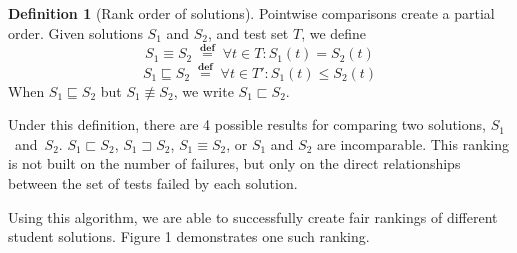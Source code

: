 \documentclass[11pt,twoside]{article}
\newcommand\defined{\mathrel{\;\stackrel{\scriptscriptstyle\mathbf{def}}{=}\;}}
\theoremstyle{definition}
\newtheorem{defn}{Definition}
\begin{document}
\begin{defn}[Rank order of solutions]
Pointwise comparisons create a partial order.
Given solutions $S_1$ and $S_2$, and test set $T$, we define
$$S_1 \equiv S_2 \defined \forall t \in T : S_1(t) = S_2(t)$$
$$S_1 \sqsubseteq S_2 \defined \forall t \in T' : S_1(t) \leq S_2(t)$$
When $S_1 \sqsubseteq S_2$ but $S_1 \not\equiv S_2$, we write
$S_1 \sqsubset S_2$.
\end{defn}
Under this definition, there are 4 possible results for comparing two solutions, $S_1$~and~$S_2$. 
$S_1 \sqsubset S_2$, $S_1 \sqsupset S_2$, $S_1 \equiv S_2$, or $S_1$ and $S_2$  are incomparable. This ranking is not built on the number of failures, but only on the direct relationships between the set of tests failed by each solution.

Using this algorithm, we are able to successfully create fair rankings of different student solutions. Figure 1 demonstrates one such ranking.
\end{document}
